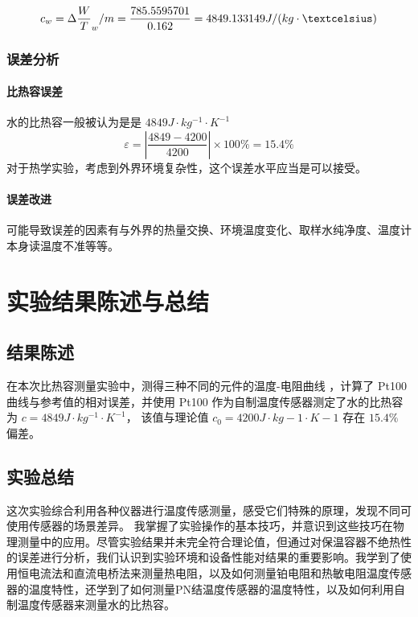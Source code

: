 \documentclass[a4paper]{../phyreport}
\begin{document}
\begin{equation}
\label{eq:13}
c_w=\Delta \frac{W}{T}_{w}/m=\frac{785.5595701}{0.162}=4849.133149 J/(kg\cdot\textcelsius)
\end{equation}

\subsubsection{误差分析}
\paragraph{比热容误差}
水的比热容一般被认为是是 $4849J · kg^{−1} · K^{−1}$
\begin{equation}
\label{eq:9}
\varepsilon=\left| \frac{4849-4200}{4200} \right|\times100\%=15.4\%
\end{equation}
对于热学实验，考虑到外界环境复杂性，这个误差水平应当是可以接受。
\paragraph{误差改进}
可能导致误差的因素有与外界的热量交换、环境温度变化、取样水纯净度、温度计本身读温度不准等等。
\longLine
\section{实验结果陈述与总结}

\subsection{结果陈述}
在本次比热容测量实验中，测得三种不同的元件的温度-电阻曲线
，计算了 Pt100 曲线与参考值的相对误差，并使用 Pt100 作为自制温度传感器测定了水的比热容为 $c = 4849J · kg^{−1} · K^{−1} $，
该值与理论值 $c_0 = 4200J · kg−1 · K−1$ 存在 $15.4\%$ 偏差。
\subsection{实验总结}
这次实验综合利用各种仪器进行温度传感测量，感受它们特殊的原理，发现不同可使用传感器的场景差异。
我掌握了实验操作的基本技巧，并意识到这些技巧在物理测量中的应用。尽管实验结果并未完全符合理论值，但通过对保温容器不绝热性的误差进行分析，我们认识到实验环境和设备性能对结果的重要影响。我学到了使用恒电流法和直流电桥法来测量热电阻，以及如何测量铂电阻和热敏电阻温度传感器的温度特性，还学到了如何测量PN结温度传感器的温度特性，以及如何利用自制温度传感器来测量水的比热容。
\endBox
\end{document}
